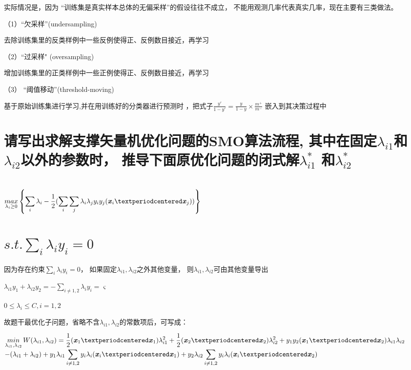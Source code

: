 \documentclass[UTF8]{ctexart}
\begin{document}
实际情况是，因为 “训练集是真实样本总体的无偏采样”的假设往往不成立，
不能用观测几率代表真实几率，现在主要有三类做法。

（1）“欠采样”(undersampling)

去除训练集里的反类样例中一些反例使得正、反例数目接近，再学习

（2）“过采样" (oversampling)

增加训练集里的正类样例中一些正例使得正、反例数目接近，再学习

（3） “阈值移动”(threshold-moving)

基于原始训练集进行学习,并在用训练好的分类器进行预测时
，把式子$\displaystyle{\frac{y'}{1-y'}=\frac{y}{1-y}×\frac{m^+}{m^-}}$
嵌入到其决策过程中

\section{请写出求解支撑矢量机优化问题的SMO算法流程,
其中在固定$\lambda _{i1}$和$\lambda _{i2}$以外的参数时，
推导下面原优化问题的闭式解$\lambda _{i1}^{*}$ 和$\lambda _{i2}^{*}$\\
\\
$\displaystyle{\mathop{max}\limits_{\lambda_{i}\geq 0}\left\{\sum_{i}\lambda _{i}-
    \frac{1}{2}
    (\sum_{i}\sum_{j}\lambda_{i}\lambda_{j}
    y_{i}y_{j}(\textbf{\emph{x}}_i·\textbf{\emph{x}}_j))\right\}}$\\
\\
$s.t.  \sum_{i} \lambda_{i} y_{i}=0$}
因为存在约束$\sum_{i} \lambda_{i} y_{i}=0$，
如果固定$\lambda _{i1},\lambda _{i2}$之外其他变量，
则$\lambda _{i1},\lambda _{i2}$可由其他变量导出

\begin{center}
    $\lambda_{i1} y_1+\lambda_{i2} y_2
        =-\sum_{i\neq 1,2}\lambda _i y_i=\varsigma$

    $0 \leq \lambda_i \leq C,i=1,2$
\end{center}

故题干最优化子问题，省略不含$\lambda_{i1},\lambda_{i2}$的常数项后，可写成：

\begin{center}

    $\displaystyle{\mathop{min}\limits_{\lambda _{i1},\lambda _{i2}}
            W(\lambda_{i1},\lambda_{i2})=
            \frac{1}{2}(\textbf{\emph{x}}_1·\textbf{\emph{x}}_1)
            \lambda_{i1}^2
            +
            \frac{1}{2}(\textbf{\emph{x}}_2·\textbf{\emph{x}}_2)
            \lambda_{i2}^2
            +
            y_1 y_2 (\textbf{\emph{x}}_1·\textbf{\emph{x}}_2)
            \lambda_{i1}\lambda_{i2}}$
    \\
    $\displaystyle{-
            (\lambda_{i1}+\lambda_{i2})
            +
            y_1 \lambda_{i1} \sum_{i\neq 1,2}y_i\lambda_i
            (\textbf{\emph{x}}_i·\textbf{\emph{x}}_1)
            +
            y_2 \lambda_{i2} \sum_{i\neq 1,2}y_i\lambda_i
            (\textbf{\emph{x}}_i·\textbf{\emph{x}}_2)
        }$

\end{center}
\end{document}
